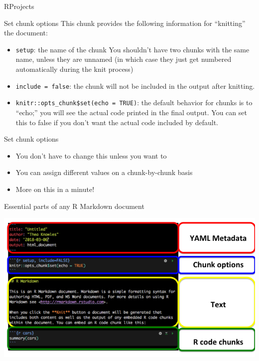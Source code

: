 \documentclass[
  ignorenonframetext,
]{beamer}
\providecommand{\tightlist}{%
  \setlength{\itemsep}{0pt}\setlength{\parskip}{0pt}}
\begin{document}
\begin{frame}[fragile]{RProjects}
\begin{block}{Set chunk options}
This chunk provides the following information for ``knitting'' the
document:

\begin{itemize}
\tightlist
\item
  \texttt{setup}: the name of the chunk You shouldn't have two chunks
  with the same name, unless they are unnamed (in which case they just
  get numbered automatically during the knit process)
\item
  \texttt{include\ =\ false}: the chunk will not be included in the
  output after knitting.
\item
  \texttt{knitr::opts\_chunk\$set(echo\ =\ TRUE)}: the default behavior
  for chunks is to ``echo;'' you will see the actual code printed in the
  final output. You can set this to false if you don't want the actual
  code included by default.
\end{itemize}

\end{block}

\begin{block}{Set chunk options}

\begin{itemize}
\tightlist
\item
  You don't have to change this unless you want to
\item
  You can assign different values on a chunk-by-chunk basis
\item
  More on this in a minute!
\end{itemize}

\end{block}

\begin{block}{Essential parts of any R Markdown document}

\includegraphics{images/rmarkdown_parts.png}


\end{block}
\end{frame}
\end{document}
